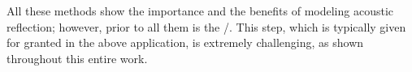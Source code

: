 \mynewline
All these methods show the importance and the benefits of modeling acoustic reflection; however, prior to all them is the \AERdef/.
This step, which is typically given for granted in the above application, is extremely challenging, as shown throughout this entire work.










